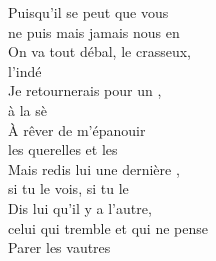 \songwordfb{} Puisqu'il se peut que vous \\
ne puis mais jamais nous en \\
On va tout débal, le crasseux, \\
l'indé \\
Je retournerais pour un , \\
à la sè \\
À rêver de m'épanouir  \\
les querelles et les  \\
Mais redis lui une dernière , \\
si tu le vois, si tu le  \\
Dis lui qu'il y a l'autre,\songwordfb{}\\
celui qui tremble et qui ne pense  \\
Parer les vautres \\